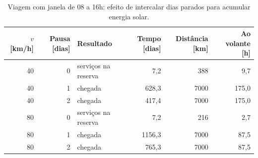 \begin{table}[H]\centering\small
\caption{Viagem com janela de 08 a 16h: efeito de intercalar dias parados para acumular energia solar.}\label{tab:acumulacao}
\begin{tabular}{rrlrrr}
\toprule $v$ [km/h] & Pausa [dias] & Resultado & Tempo [dias] & Distância [km] & Ao volante [h] \\\midrule
40 & 0 & serviços na reserva & 7,2 & 388 & 9,7 \\
40 & 1 & chegada & 628,3 & 7000 & 175,0 \\
40 & 2 & chegada & 417,4 & 7000 & 175,0 \\
80 & 0 & serviços na reserva & 7,2 & 216 & 2,7 \\
80 & 1 & chegada & 1156,3 & 7000 & 87,5 \\
80 & 2 & chegada & 765,3 & 7000 & 87,5 \\
\bottomrule\end{tabular}\end{table}
